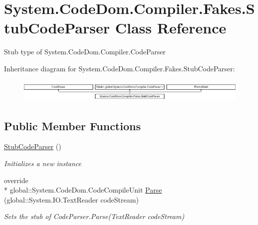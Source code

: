 \hypertarget{class_system_1_1_code_dom_1_1_compiler_1_1_fakes_1_1_stub_code_parser}{\section{System.\-Code\-Dom.\-Compiler.\-Fakes.\-Stub\-Code\-Parser Class Reference}
\label{class_system_1_1_code_dom_1_1_compiler_1_1_fakes_1_1_stub_code_parser}
}


Stub type of System.\-Code\-Dom.\-Compiler.\-Code\-Parser 


Inheritance diagram for System.\-Code\-Dom.\-Compiler.\-Fakes.\-Stub\-Code\-Parser\-:\begin{figure}[H]
\begin{center}
\leavevmode
\includegraphics[height=1.114428cm]{class_system_1_1_code_dom_1_1_compiler_1_1_fakes_1_1_stub_code_parser}
\end{center}
\end{figure}
\subsection*{Public Member Functions}
\begin{DoxyCompactItemize}
\item 
\hyperlink{class_system_1_1_code_dom_1_1_compiler_1_1_fakes_1_1_stub_code_parser_a25ad39631adac8af135206ab0989c71f}{Stub\-Code\-Parser} ()
\begin{DoxyCompactList}\small\item\em Initializes a new instance\end{DoxyCompactList}\item 
override \\*
global\-::\-System.\-Code\-Dom.\-Code\-Compile\-Unit \hyperlink{class_system_1_1_code_dom_1_1_compiler_1_1_fakes_1_1_stub_code_parser_a568c0881099dc61e4047e784a93fbcd4}{Parse} (global\-::\-System.\-I\-O.\-Text\-Reader code\-Stream)
\begin{DoxyCompactList}\small\item\em Sets the stub of Code\-Parser.\-Parse(\-Text\-Reader code\-Stream)\end{DoxyCompactList}\end{DoxyCompactItemize}
